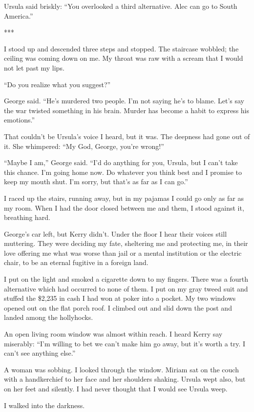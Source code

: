 \documentclass{novel}
\begin{document}
Ursula said briskly: “You overlooked a third alternative. Alec can go to South America.”

***

I stood up and descended three steps and stopped. The staircase wobbled; the ceiling was coming down on me. My throat was raw with a scream that I would not let past my lips.

“Do you realize what you suggest?”

George said. “He’s murdered two people. I’m not saying he’s to blame. Let’s say the war twisted something in his brain. Murder has become a habit to express his emotions.”

That couldn’t be Ursula’s voice I heard, but it was. The deepness had gone out of it. She whimpered: “My God, George, you’re wrong!”

“Maybe I am,” George said. “I’d do anything for you, Ursula, but I can’t take this chance. I’m going home now. Do whatever you think best and I promise to keep my mouth shut. I’m sorry, but that’s as far as I can go.”

I raced up the stairs, running away, but in my pajamas I could go only as far as my room. When I had the door closed between me and them, I stood against it, breathing hard.

George’s car left, but Kerry didn’t. Under the floor I hear their voices still muttering. They were deciding my fate, sheltering me and protecting me, in their love offering me what was worse than jail or a mental institution or the electric chair, to be an eternal fugitive in a foreign land.

I put on the light and smoked a cigarette down to my fingers. There was a fourth alternative which had occurred to none of them. I put on my gray tweed suit and stuffed the \$2,235 in cash I had won at poker into a pocket. My two windows opened out on the flat porch roof. I climbed out and slid down the post and landed among the hollyhocks.

An open living room window was almost within reach. I heard Kerry say miserably: “I’m willing to bet we can’t make him go away, but it’s worth a try. I can’t see anything else.”

A woman was sobbing. I looked through the window. Miriam sat on the couch with a handkerchief to her face and her shoulders shaking. Ursula wept also, but on her feet and silently. I had never thought that I would see Ursula weep.

I walked into the darkness.
\end{document}
